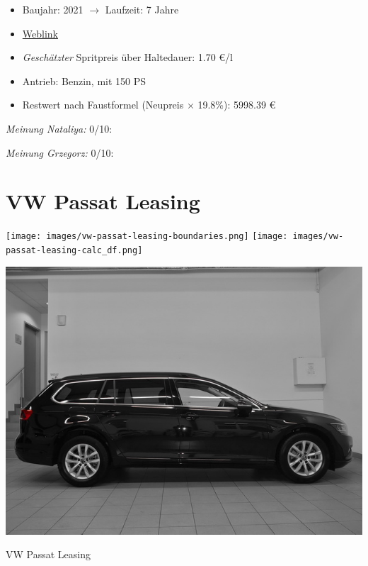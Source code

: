 \documentclass[landscape, DIV=99, 14pt]{scrartcl}
\begin{document}
\begin{itemize}
    \item Baujahr: 2021 $\rightarrow$ Laufzeit: 7 Jahre
    \item \href{https://www.autosuche.de/auto/REVVNDQ3NjgwMjc5NzI=?t_manuf=BQ&t_petr=B&t_model=BQBM&t_gear=A&t_ez_fr=2020&t_pe_fr=35000&sort=PRICE_SALE&sortdirection=ASC&viewMode=tile}{Weblink}
    \item \emph{Gesch\"atzter} Spritpreis \"uber Haltedauer: 1.70 \euro{}/l
    \item Antrieb: Benzin, mit 150 PS
    \item Restwert nach Faustformel (Neupreis $\times$ 19.8\%): 5998.39 \euro{}
\end{itemize}

\begin{small}
\emph{Meinung Nataliya:} 0/10: 
        
\emph{Meinung Grzegorz:} 0/10: 
\end{small}

\pagebreak


\twocolumn

\section*{VW Passat Leasing}
\begin{center}
\texttt{[image: images/vw-passat-leasing-boundaries.png]}
\null
\vspace{0.5cm}
\texttt{[image: images/vw-passat-leasing-calc\_df.png]}
\end{center}

\pagebreak
\begin{center}
\includegraphics[width=0.9\columnwidth]{cars/vw-passat-leasing.jpg}

VW Passat Leasing
\end{center}
\end{document}
